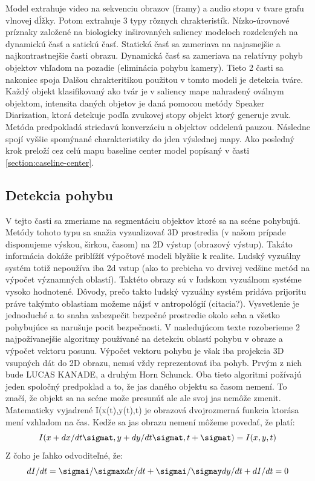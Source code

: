 Model extrahuje video na sekvenciu obrazov (framy) a audio stopu v tvare grafu vlnovej dĺžky. Potom extrahuje 3 typy rôznych chrakteristík. Nízko-úrovnové príznaky založené na biologicky inširovaných saliency modeloch rozdelených na dynamickú časť a satickú časť. Statická časť sa zameriava na najasnejšie a najkontrastnejšie časti obrazu. Dynamická časť sa zameriava na relatívny pohyb objektov vhľadom na pozadie (eliminácia pohybu kamery). Tieto 2 časti sa nakoniec spoja
Dalšou chrakteritikou použitou v tomto modeli je detekcia tváre. Každý objekt klasifikovaný ako tvár je v saliency mape nahradený oválnym objektom, intensita daných objetov je daná pomocou metódy Speaker Diarization, ktorá detekuje podľa zvukovej stopy objekt ktorý generuje zvuk. Metóda predpokladá striedavú konverzáciu n objektov oddelenú pauzou. Následne spojí vyššie spomýnané charakteristiky do jden výslednej mapy. Ako posledný krok preloží cez celú mapu baseline center model popísaný v časti \ref{section:caseline-center}.

\subsection{Detekcia pohybu}
V tejto časti sa zmeriame na segmentáciu objektov ktoré sa na scéne pohybujú. Metódy tohoto typu sa snažia vyzualizovať 3D prostredia (v našom prípade disponujeme výskou, širkou, časom) na 2D výstup (obrazový výstup). Takáto informácia dokáže priblížíť výpočtové modeli blyžšie k realite. Ludský vyzuálny systém totiž nepoužíva iba 2d vstup (ako to prebieha vo drvivej vedšine metód na výpočet významných oblastí). Taktéto obrazy sú v ľudskom vyzuálnom systéme vysoko hodnotené. Dôvody, prečo takto ludský vyzuálny systém pridáva prijoritu práve takýmto oblastiam možeme nájsť v antropológií (citacia?). Vysvetlenie je jednoduché a to snaha zabezpečit bezpečné prostredie okolo seba a všetko pohybujúce sa narušuje pocit bezpečnosti. V nasledujúcom texte rozoberieme 2 najpožívanejšie algoritmy používané na detekciu oblastí pohybu v obraze a výpočet vektoru posunu. Výpočet vektoru pohybu je však iba projekcia 3D vsupných dát do 2D obrazu, nemsí vždy reprezentovať iba pohyb. Prvým z nich bude LUCAS KANADE\cite{lucas-kanade}, a druhým Horn Schunck\cite{horn-schunck}. Oba tieto algoritmi požívajú jeden spoločný predpoklad a to, že jas daného objektu sa časom nemení. To značí, že objekt sa na scéne može presunúť ale ale svoj jas nemôže zmenit. Matematicky vyjadrené I(x(t),y(t),t) je obrazová dvojrozmerná funkcia ktorása mení vzhladom na čas. Kedže sa jas obrazu nemení môžeme povedať, že platí:
\begin{equation}
  I(x + dx/dt \sigmat ,y + dy/dt \sigmat, t + \sigmat) = I(x,y,t)
\end{equation}
Z čoho je ľahko odvoditeľné, že:
\begin{equation}
  dI/dt = \sigmai/\sigmax dx/dt + \sigmai/\sigmay dy/dt + dI/dt  =  0
\end{equation}


